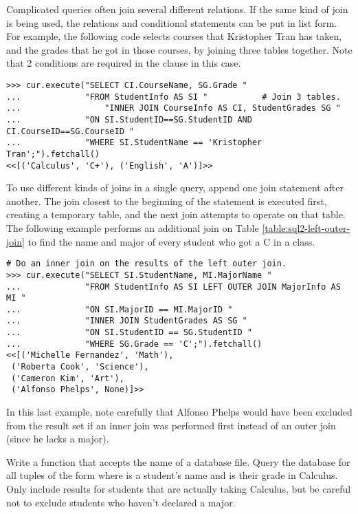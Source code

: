 Complicated queries often join several different relations.
If the same kind of join is being used, the relations and conditional statements can be put in list form.
For example, the following code selects courses that Kristopher Tran has taken, and the grades that he got in those courses, by joining three tables together.
Note that 2 conditions are required in the  clause in this case.

\begin{lstlisting}
>>> cur.execute("SELECT CI.CourseName, SG.Grade "
...             "FROM StudentInfo AS SI "           # Join 3 tables.
...                 "INNER JOIN CourseInfo AS CI, StudentGrades SG "
...             "ON SI.StudentID==SG.StudentID AND CI.CourseID==SG.CourseID "
...             "WHERE SI.StudentName == 'Kristopher Tran';").fetchall()
<<[('Calculus', 'C+'), ('English', 'A')]>>
\end{lstlisting}

To use different kinds of joins in a single query, append one join statement after another.
The join closest to the beginning of the statement is executed first, creating a temporary table, and the next join attempts to operate on that table.
The following example performs an additional join on Table \ref{table:sql2-left-outer-join} to find the name and major of every student who got a C in a class.

\begin{lstlisting}
# Do an inner join on the results of the left outer join.
>>> cur.execute("SELECT SI.StudentName, MI.MajorName "
...             "FROM StudentInfo AS SI LEFT OUTER JOIN MajorInfo AS MI "
...             "ON SI.MajorID == MI.MajorID "
...             "INNER JOIN StudentGrades AS SG "
...             "ON SI.StudentID == SG.StudentID "
...             "WHERE SG.Grade == 'C';").fetchall()
<<[('Michelle Fernandez', 'Math'),
 ('Roberta Cook', 'Science'),
 ('Cameron Kim', 'Art'),
 ('Alfonso Phelps', None)]>>
\end{lstlisting}

In this last example, note carefully that Alfonso Phelps would have been excluded from the result set if an inner join was performed first instead of an outer join (since he lacks a major).

\begin{problem} %
Write a function that accepts the name of a database file.
Query the database for all tuples of the form  where  is a student's name and  is their grade in Calculus.
Only include results for students that are actually taking Calculus, but be careful not to exclude students who haven't declared a major.
\end{problem}

